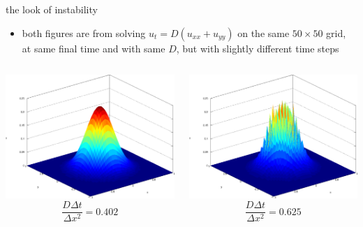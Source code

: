 \begin{frame}{the look of instability}

\begin{itemize}
\item both figures are from solving $u_t = D(u_{xx} + u_{yy})$ on the same $50\times 50$ grid, at same final time and with same $D$, but with slightly different time steps
\end{itemize}

\bigskip
\begin{columns}
\begin{column}{0.5\textwidth}
\begin{center}
\includegraphics[width=1.0\textwidth]{pdffigs/stability}
  $$\frac{D\Delta t}{\Delta x^2}= 0.402$$
\end{center}
\end{column}
\begin{column}{0.5\textwidth}
\begin{center}
\includegraphics[width=1.0\textwidth]{pdffigs/instability}
  $$\frac{D\Delta t}{\Delta x^2}= 0.625$$
\end{center}
\end{column}
\end{columns}
\end{frame}


